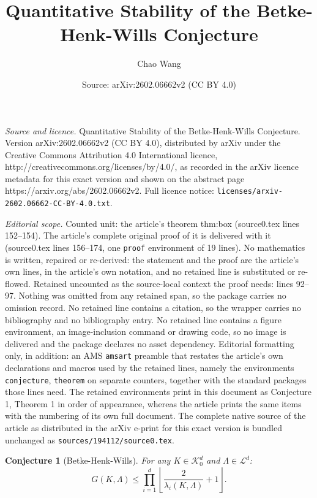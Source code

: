 \documentclass[10pt,a4paper]{amsart}
\title{Quantitative Stability of the Betke-Henk-Wills Conjecture}
\author{Chao Wang}
\date{Source: arXiv:2602.06662v2 (CC BY 4.0)}
\newtheorem{conjecture}{Conjecture}
\newcommand{\K}{\mathcal{K}}
\begin{document}
\maketitle

\noindent\emph{Source and licence.} Quantitative Stability of the Betke-Henk-Wills Conjecture. Version arXiv:2602.06662v2 (CC BY 4.0), distributed by arXiv under the Creative Commons Attribution 4.0 International licence, http://creativecommons.org/licenses/by/4.0/, as recorded in the arXiv licence metadata for this exact version and shown on the abstract page https://arxiv.org/abs/2602.06662v2. Full licence notice: \texttt{licenses/arxiv-2602.06662-CC-BY-4.0.txt}.\par\smallskip

\noindent\textit{Editorial scope.} Counted unit: the article's theorem thm:box (source0.tex lines 152--154). The article's complete original proof of it is delivered with it (source0.tex lines 156--174, one \texttt{proof} environment of 19 lines). No mathematics is written, repaired or re-derived: the statement and the proof are the article's own lines, in the article's own notation, and no retained line is substituted or re-flowed.  Retained uncounted as the source-local context the proof needs: lines 92--97.  Nothing was omitted from any retained span, so the package carries no omission record.  No retained line contains a citation, so the wrapper carries no bibliography and no bibliography entry.  No retained line contains a figure environment, an image-inclusion command or drawing code, so no image is delivered and the package declares no asset dependency.  Editorial formatting only, in addition: an AMS \texttt{amsart} preamble that restates the article's own declarations and macros used by the retained lines, namely the environments \texttt{conjecture}, \texttt{theorem} on separate counters, together with the standard packages those lines need.  The retained environments print in this document as Conjecture 1, Theorem 1 in order of appearance, whereas the article prints the same items with the numbering of its own full document.  The complete native source of the article as distributed in the arXiv e-print for this exact version is bundled unchanged as \texttt{sources/194112/source0.tex}.
\begin{conjecture}[Betke-Henk-Wills] \label{conj:main}
For any $K \in \K^d_0$ and $\Lambda \in \mathcal{L}^d$:
\begin{equation}
G(K, \Lambda) \le \prod_{i=1}^d \left\lfloor \frac{2}{\lambda_i(K, \Lambda)} + 1 \right\rfloor.
\end{equation}
\end{conjecture}
\end{document}
